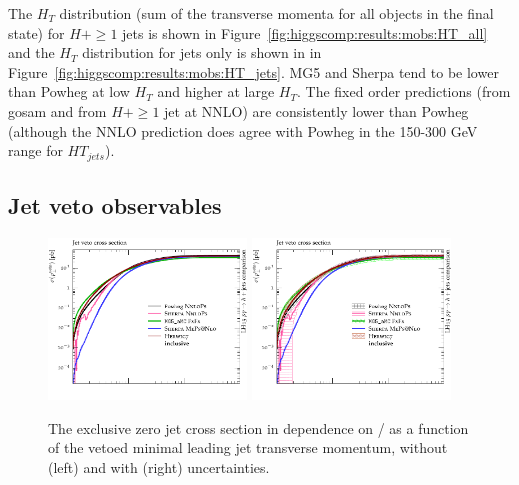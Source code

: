 The $H_T$ distribution (sum of the transverse momenta for all objects
in the final state) for $H+\ge1$ jets is shown in
Figure~\ref{fig:higgscomp:results:mobs:HT_all} and the $H_T$
distribution for jets only is shown in in
Figure~\ref{fig:higgscomp:results:mobs:HT_jets}. 
MG5 and Sherpa tend to be lower than Powheg at low $H_T$ and higher at
large $H_T$. The fixed order predictions (from gosam and from $H+\ge1$
jet at NNLO) are consistently lower than Powheg (although the NNLO
prediction does agree with Powheg in the 150-300 GeV range for
$HT_{jets}$).



\clearpage
\subsection{Jet veto observables}
\label{sec:hjetscomp:results:jvobs}

\begin{figure}[t!]
  \centering
  \includegraphics[width=0.47\textwidth]{figures/hjetscomp_u_xs_jet_veto_j0.pdf}
  \hfill
  \includegraphics[width=0.47\textwidth]{figures/hjetscomp_xs_jet_veto_j0.pdf}
  \caption{
    The exclusive zero jet cross section in dependence on / as a
    function of the vetoed minimal leading jet transverse momentum,
    without (left) and with (right) uncertainties.
    \label{fig:higgscomp:results:jvobs:jvxs0}
  }
\end{figure}

